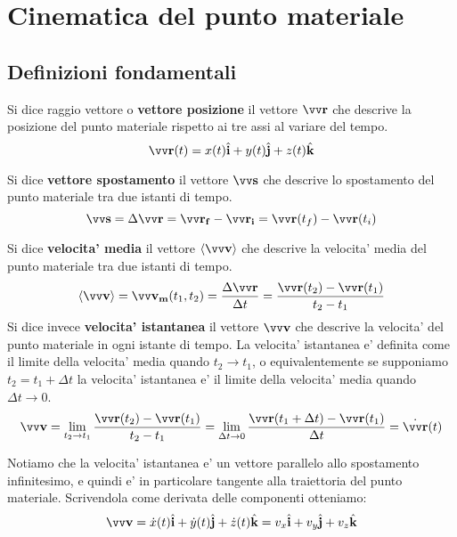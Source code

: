 \chapter{Cinematica del punto materiale}

\section{Definizioni fondamentali}
\begin{definition}
    Si dice raggio vettore o \textbf{vettore posizione} il vettore $\bvv{r}$ che descrive la posizione del punto materiale rispetto ai tre assi al variare del tempo.
    \[\bvv{r}(t) = x(t)\bh{i} + y(t)\bh{j} + z(t)\bh{k}\]
\end{definition}

\begin{definition}
    Si dice \textbf{vettore spostamento} il vettore $\bvv{s}$ che descrive lo spostamento del punto materiale tra due istanti di tempo.
    \[\bvv{s} = \Delta\bvv{r} = \bvv{r_f} - \bvv{r_i} = \bvv{r}(t_f) - \bvv{r}(t_i)\]
\end{definition}

\begin{definition}
    Si dice \textbf{velocita' media} il vettore $\ang{\bvv{v}}$ che descrive la velocita' media del punto materiale tra due istanti di tempo.
        \begin{equation} \label{def_vel_media}
            \ang{\bvv{v}} = \bvv{v_m}(t_1, t_2) = \frac{\Delta\bvv{r}}{\Delta t} = \frac{\bvv{r}(t_2) - \bvv{r}(t_1)}{t_2-t_1}
        \end{equation}
    Si dice invece \textbf{velocita' istantanea} il vettore $\bvv{v}$ che descrive la velocita' del punto materiale in ogni istante di tempo.
    La velocita' istantanea e' definita come il limite della velocita' media quando $t_2 \to t_1$, o equivalentemente se supponiamo
    $t_2 = t_1 + \Delta t$ la velocita' istantanea e' il limite della velocita' media quando $\Delta t \to 0$.
    \[\bvv{v} = \lim_{t_2 \to t_1} \frac{\bvv{r}(t_2) - \bvv{r}(t_1)}{t_2-t_1} = \lim_{\Delta t \to 0} \frac{\bvv{r}(t_1 + \Delta t) - \bvv{r}(t_1)}{\Delta t} = \dot{\bvv{r}}(t)\]
\end{definition}

Notiamo che la velocita' istantanea e' un vettore parallelo allo spostamento infinitesimo, e quindi e' in particolare tangente alla traiettoria
del punto materiale. Scrivendola come derivata delle componenti otteniamo:
\[\bvv{v} = \dot{x}(t)\bh{i} + \dot{y}(t)\bh{j} + \dot{z}(t)\bh{k} = v_x\bh{i} + v_y\bh{j} + v_z\bh{k}\]

